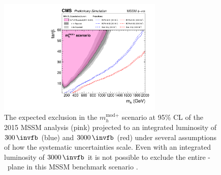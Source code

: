 \begin{figure}[h!]
\begin{center}
\includegraphics[width=0.7\textwidth]{./Conclusion/Figures/scenario_comp2.pdf}
\end{center}
\caption[The expected exclusion in the $m_{h}^{\text{mod+}}$ scenario
at 95\% CL of the 2015 MSSM analysis, projected to an integrated luminosity of $300$ and $3000\,\invfb$.]{The expected exclusion in the $m_{h}^{\text{mod+}}$ scenario
 at 95\% CL of the 2015 MSSM analysis (pink)
projected to an integrated luminosity of $300\,\invfb$ (blue) and $3000\,\invfb$ (red)
under several assumptions of how the systematic uncertainties scale. Even with an integrated 
luminosity of $3000\,\invfb$ it is not possible to exclude the entire \mA-\tanb~plane
in this \ac{MSSM} benchmark scenario \cite{HTT-projection}.}
\label{fig:mssm_projection_fig}
\end{figure}

